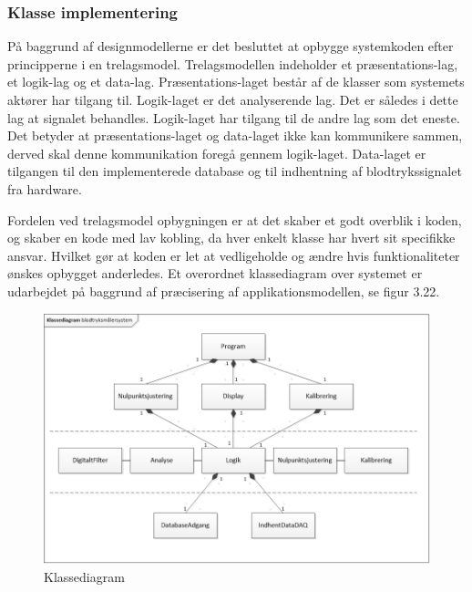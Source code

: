 \subsubsection{Klasse implementering}
På baggrund af designmodellerne er det besluttet at opbygge systemkoden efter principperne i en trelagsmodel. Trelagsmodellen indeholder et præsentations-lag, et logik-lag og et data-lag. Præsentations-laget består af de klasser som systemets aktører har tilgang til. Logik-laget er det analyserende lag. Det er således i dette lag at signalet behandles. Logik-laget har tilgang til de andre lag som det eneste. Det betyder at præsentations-laget og data-laget ikke kan kommunikere sammen, derved skal denne kommunikation foregå gennem logik-laget. Data-laget er tilgangen til den implementerede database og til indhentning af blodtrykssignalet fra hardware.

Fordelen ved trelagsmodel opbygningen er at det skaber et godt overblik i koden, og skaber en kode med lav kobling, da hver enkelt klasse har hvert sit specifikke ansvar. Hvilket gør at koden er let at vedligeholde og ændre hvis funktionaliteter ønskes opbygget anderledes. Et overordnet klassediagram over systemet er udarbejdet på baggrund af præcisering af applikationsmodellen, se figur 3.22.
\begin{figure}[H]
	\centering
	\includegraphics[width=1.0\textwidth]{Figurer/Klassediagram}
	\caption{Klassediagram}
\end{figure}

